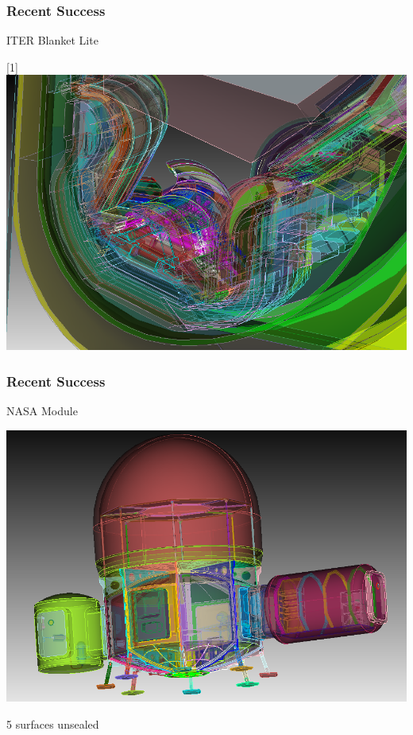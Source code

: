 \documentclass[14pt]{beamer}
\begin{document}
\begin{frame}
\frametitle{Recent Success}

ITER Blanket Lite
\begin{center}
\scalebox{-1}[1]{\includegraphics[scale=0.3]{blanketlitemodel_detail.png}}
\end{center}

\end{frame}

\begin{frame}
\frametitle{Recent Success}

NASA Module
\begin{center}
\includegraphics[scale=0.3]{nasa_module.png}
\end{center}
5 surfaces unsealed
\end{frame}
\end{document}
